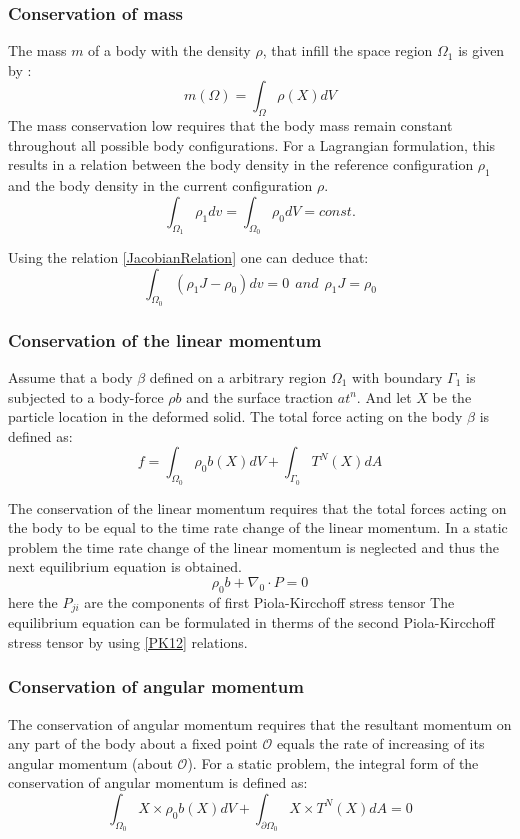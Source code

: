 \subsubsection*{ Conservation of mass}
The mass $m$ of a body with the density $\rho$, that infill the space region $\Omega_1$ is given by :
\begin{equation}
m(\Omega) = \int_{\Omega} \rho(X)dV
\end{equation}
The mass conservation low requires that the body mass remain constant throughout all possible body configurations. For a Lagrangian formulation, this results in a relation between the body density in the reference configuration $\rho_1$ and the body density in the current configuration $\rho$.
$$\int_{\Omega_1} \rho_1 dv = \int_{\Omega_0} \rho_0 dV = const. $$

Using the relation \ref{JacobianRelation} one can deduce that:
\begin{equation}
\int_{\Omega_0} \left( \rho_1 J - \rho_0\right)dv = 0 \  \ and \  \ \rho_1 J = \rho_0
\end{equation}
\subsubsection*{Conservation of the linear momentum}
Assume that a body $\beta$ defined on a arbitrary region $\Omega_1$ with boundary $\Gamma_1$ is subjected to a body-force $\rho  b$ and the surface traction $a t^n$. And let $X$ be the particle location in the deformed solid.
 The total force acting on the body $\beta$ is defined as:
\begin{equation}
f = \int_{\Omega_0}\rho_0 b(X)dV + \int_{\Gamma_0} T^N(X)dA
\end{equation}
 
The conservation of the linear momentum requires that the total forces acting on the body to be equal to the time rate change of the linear momentum. In a static problem the time rate change of the linear momentum is neglected and thus the next equilibrium equation is obtained.
\begin{equation}
\rho_0 b+\nabla_0 \cdot P  = 0
\end{equation}
here the $P_{ji}$ are the components of first Piola-Kircchoff stress tensor
The equilibrium equation can be formulated in therms of the second Piola-Kircchoff stress tensor by using \ref{PK12} relations.
\subsubsection*{Conservation of angular momentum}
The conservation of angular momentum requires that the resultant momentum on any part of the body about a fixed point $\mathcal{O}$ equals the rate of increasing of its angular momentum (about $\mathcal{O}$). For a static problem, the integral form of the conservation of angular momentum is defined as:
\begin{equation}
\label{angularMomentum}
\int_{\Omega_0} X \times \rho_0 b(X)dV + \int_{\partial \Omega_0} X \times  T^N(X)dA = 0
\end{equation}

